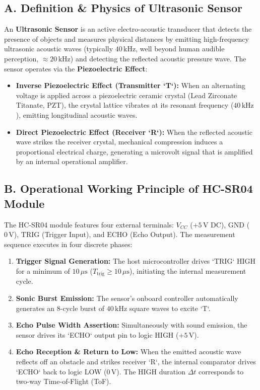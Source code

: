 \documentclass[10pt,a4paper]{article}
\begin{document}
\subsection*{A. Definition \& Physics of Ultrasonic Sensor}
An \textbf{Ultrasonic Sensor} is an active electro-acoustic transducer that detects the presence of objects and measures physical distances by emitting high-frequency ultrasonic acoustic waves (typically $40\,\text{kHz}$, well beyond human audible perception, $\approx 20\,\text{kHz}$) and detecting the reflected acoustic pressure wave. The sensor operates via the \textbf{Piezoelectric Effect}:
\begin{itemize}[noitemsep]
    \item \textbf{Inverse Piezoelectric Effect (Transmitter `T`):} When an alternating voltage is applied across a piezoelectric ceramic crystal (Lead Zirconate Titanate, PZT), the crystal lattice vibrates at its resonant frequency ($40\,\text{kHz}$), emitting longitudinal acoustic waves.
    \item \textbf{Direct Piezoelectric Effect (Receiver `R`):} When the reflected acoustic wave strikes the receiver crystal, mechanical compression induces a proportional electrical charge, generating a microvolt signal that is amplified by an internal operational amplifier.
\end{itemize}

\subsection*{B. Operational Working Principle of HC-SR04 Module}
The HC-SR04 module features four external terminals: $V_{CC}$ ($+5\,\text{V}$ DC), $\text{GND}$ ($0\,\text{V}$), $\text{TRIG}$ (Trigger Input), and $\text{ECHO}$ (Echo Output). The measurement sequence executes in four discrete phases:
\begin{enumerate}[leftmargin=*]
    \item \textbf{Trigger Signal Generation:} The host microcontroller drives `TRIG` HIGH for a minimum of $10\,\mu\text{s}$ ($T_{\text{trig}} \ge 10\,\mu\text{s}$), initiating the internal measurement cycle.
    \item \textbf{Sonic Burst Emission:} The sensor's onboard controller automatically generates an 8-cycle burst of $40\,\text{kHz}$ square waves to excite `T`.
    \item \textbf{Echo Pulse Width Assertion:} Simultaneously with sound emission, the sensor drives its `ECHO` output pin to logic HIGH ($+5\,\text{V}$).
    \item \textbf{Echo Reception \& Return to Low:} When the emitted acoustic wave reflects off an obstacle and strikes receiver `R`, the internal comparator drives `ECHO` back to logic LOW ($0\,\text{V}$). The HIGH duration $\Delta t$ corresponds to two-way Time-of-Flight (ToF).
\end{enumerate}
\end{document}
